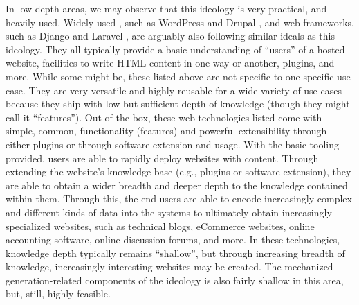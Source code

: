 In low-depth areas, we may observe that this ideology is very practical, and
heavily used. Widely used , such as WordPress \cite{WordPress} and
Drupal \cite{Drupal}, and web frameworks, such as Django \cite{Django} and
Laravel \cite{Laravel}, are arguably also following similar ideals as this
ideology. They all typically provide a basic understanding of ``users'' of a
hosted website, facilities to write HTML content in one way or another, plugins,
and more. While some might be, these listed above are not specific to one
specific use-case. They are very versatile and highly reusable for a wide
variety of use-cases because they ship with low but sufficient depth of
knowledge (though they might call it ``features''). Out of the box, these web
technologies listed come with simple, common, functionality (features) and
powerful extensibility through either plugins or through software extension and
usage. With the basic tooling provided, users are able to rapidly deploy
websites with content. Through extending the website's knowledge-base (e.g.,
plugins or software extension), they are able to obtain a wider breadth and
deeper depth to the knowledge contained within them. Through this, the end-users
are able to encode increasingly complex and different kinds of data into the
systems to ultimately obtain increasingly specialized websites, such as
technical blogs, eCommerce websites, online accounting software, online
discussion forums, and more. In these technologies, knowledge depth typically
remains ``shallow'', but through increasing breadth of knowledge, increasingly
interesting websites may be created. The mechanized generation-related
components of the ideology is also fairly shallow in this area, but, still,
highly feasible.



